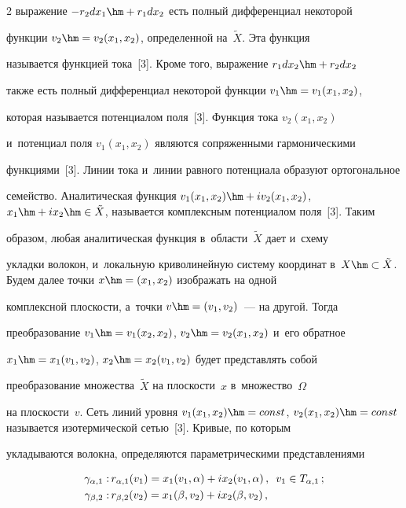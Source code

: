 \begin{multicols}{2}
выражение $-r_2dx_1\hm+ r_1dx_2$ есть полный дифференциал некоторой 


функции $v_2\hm= v_2(x_1, x_2)$, определенной на~$\tilde{X}$. Эта функция 


называется функцией тока~[3]. Кроме того, выражение $r_1dx_2\hm+ r_2dx_2$ 


также есть полный дифференциал некоторой функции $v_1\hm= v_1(x_1, x_2)$, 


которая называется потенциалом поля~[3]. Функция тока $v_2(x_1, x_2)$  


и~потенциал поля $v_1(x_1, x_2)$ являются сопряженными гармоническими 


функциями~[3]. Линии тока и~линии равного потенциала образуют ортогональное 


семейство. Аналитическая функция $v_1(x_1, x_2)\hm+ iv_2(x_1,x_2)$, $x_1\hm+ 


ix_2\hm\in \tilde{X}$, называется комплексным потенциалом поля~[3]. Таким 


образом, любая аналитическая функция в~об\-ласти~$\tilde{X}$ дает и~схему 


уклад\-ки волокон, и~локальную криволинейную систему координат в~$X\hm\subset 


\tilde{X}$. Будем далее точ\-ки $x\hm= (x_1, x_2)$ изображать на одной 


комплексной плос\-кости, а~точ\-ки $v\hm= (v_1, v_2)$~--- на другой. Тогда 


преобразование $v_1\hm=v_1(x_2, x_2)$, $v_2\hm= v_2(x_1, x_2)$ и~его обратное 


$x_1\hm= x_1(v_1, v_2)$, $x_2\hm= x_2(v_1, v_2)$ будет пред\-став\-лять собой 


преобразование множества~$\tilde{X}$ на плоскости~$x$ в~множество~$\Omega$ 


на плоскости~$v$. Сеть линий уров\-ня $v_1(x_1, x_2)\hm=const$, $v_2(x_1, 


x_2)\hm= const$ называется изотермической сетью~[3]. Кривые, по которым 


укладываются волокна, определяются па\-ра\-мет\-ри\-че\-ски\-ми пред\-став\-ле\-ни\-ями


  \begin{align*}


  \gamma_{\alpha,1}:\,& r_{\alpha,1} (v_1) 


=x_1(v_1,\alpha)+ix_2(v_1,\alpha)\,,\enskip v_1\in T_{\alpha,1}\,;\\


  \gamma_{\beta,2}:\, & r_{\beta,2} (v_2) =x_1(\beta, v_2)+ix_2(\beta, v_2)\,,\enskip 



\end{align*}
\end{multicols}
